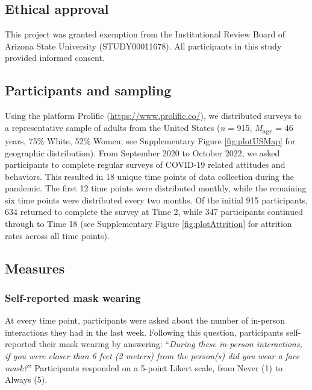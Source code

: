 \documentclass[
  man, donotrepeattitle,floatsintext]{apa6}
\begin{document}
\hypertarget{ethical-approval}{%
\subsection{Ethical approval}\label{ethical-approval}}

This project was granted exemption from the Institutional Review Board of Arizona State University (STUDY00011678). All participants in this study provided informed consent.

\hypertarget{participants-and-sampling}{%
\subsection{Participants and sampling}\label{participants-and-sampling}}

Using the platform Prolific (\url{https://www.prolific.co/}), we distributed surveys to a representative sample of adults from the United States (\emph{n} = 915, \emph{M}\textsubscript{age} = 46 years, 75\% White, 52\% Women; see Supplementary Figure \ref{fig:plotUSMap} for geographic distribution). From September 2020 to October 2022, we asked participants to complete regular surveys of COVID-19 related attitudes and behaviors. This resulted in 18 unique time points of data collection during the pandemic. The first 12 time points were distributed monthly, while the remaining six time points were distributed every two months. Of the initial 915 participants, 634 returned to complete the survey at Time 2, while 347 participants continued through to Time 18 (see Supplementary Figure \ref{fig:plotAttrition} for attrition rates across all time points).

\hypertarget{measures}{%
\subsection{Measures}\label{measures}}

\hypertarget{self-reported-mask-wearing}{%
\subsubsection{Self-reported mask wearing}\label{self-reported-mask-wearing}}

At every time point, participants were asked about the number of in-person interactions they had in the last week. Following this question, participants self-reported their mask wearing by answering: ``\emph{During these in-person interactions, if you were closer than 6 feet (2 meters) from the person(s) did you wear a face mask?}'' Participants responded on a 5-point Likert scale, from Never (1) to Always (5).
\end{document}
